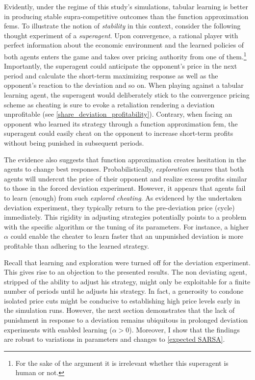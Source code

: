 Evidently, under the regime of this study's simulations, tabular learning is better in producing stable supra-competitive outcomes than the function approximation \gls{fem}s. To illustrate the notion of \emph{stability} in this context, consider the following thought experiment of a \emph{superagent}. Upon convergence, a rational player with perfect information about the economic environment and the learned policies of both agents enters the game and takes over pricing authority from one of them.\footnote{For the sake of the argument it is irrelevant whether this superagent is human or not.} Importantly, the superagent could anticipate the opponent's price in the next period and calculate the short-term maximizing response as well as the opponent's reaction to the deviation and so on. When playing against a tabular learning agent, the superagent would deliberately stick to the convergence pricing scheme as cheating is sure to evoke a retaliation rendering a deviation unprofitable (see \autoref{share_deviation_profitability}). Contrary, when facing an opponent who learned its strategy through a function approximation \gls{fem}, the superagent could easily cheat on the opponent to increase short-term profits without being punished in subsequent periods.

The evidence also suggests that function approximation creates hesitation in the agents to change best responses. Probabilistically, \emph{exploration} ensures that both agents will undercut the price of their opponent and realize excess profits similar to those in the forced deviation experiment. However, it appears that agents fail to learn (enough) from such \emph{explored cheating}. As evidenced by the undertaken deviation experiment, they typically return to the pre-deviation price (cycle) immediately. This rigidity in adjusting strategies potentially points to a problem with the specific algorithm or the tuning of its parameters. For instance, a higher $\alpha$ could enable the cheater to learn faster that an unpunished deviation is more profitable than adhering to the learned strategy. 

Recall that learning and exploration were turned off for the deviation experiment. This gives rise to an objection to the presented results. The non deviating agent, stripped of the ability to adjust his strategy, might only be exploitable for a finite number of periods until he adjusts his strategy. In fact, a generosity to condone isolated price cuts might be conducive to establishing high price levels early in the simulation runs. However, the next section demonstrates that the lack of punishment in response to a deviation remains ubiquitous in prolonged deviation experiments with enabled learning ($\alpha > 0$). Moreover, I show that the findings are robust to variations in parameters and changes to \autoref{expected SARSA}.
